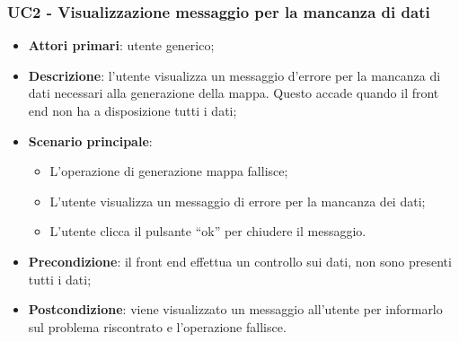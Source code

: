\subsubsection{UC2 - Visualizzazione messaggio per la mancanza di dati } %
\begin{itemize}
	\item \textbf{Attori primari}: utente generico;
	\item \textbf{Descrizione}: l’utente visualizza un messaggio d’errore per la mancanza di dati necessari alla generazione della mappa. Questo accade quando il front end non ha a disposizione tutti i dati;
	\item \textbf{Scenario principale}: 
	\begin{itemize}
		\item L’operazione di generazione mappa fallisce;
		\item L’utente visualizza un messaggio di errore per la mancanza dei dati;
		\item L’utente clicca il pulsante “ok” per chiudere il messaggio.
	\end{itemize}
	\item \textbf{Precondizione}: il front end effettua un controllo sui dati, non sono presenti tutti i dati;
	\item \textbf{Postcondizione}: viene visualizzato un messaggio all’utente per informarlo sul problema riscontrato e l’operazione fallisce.
\end{itemize}

